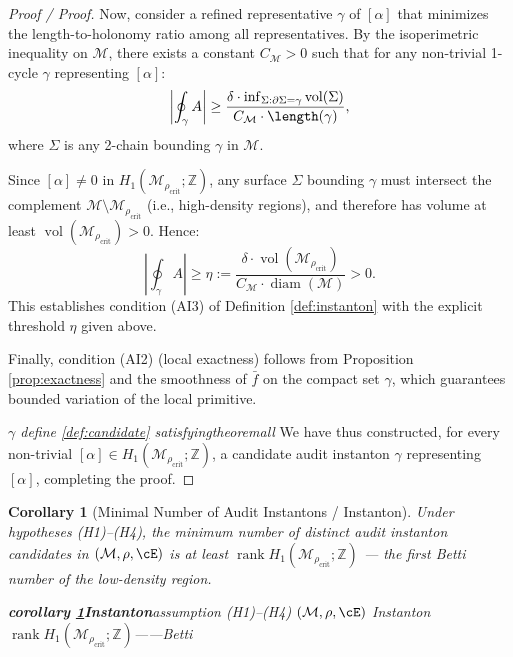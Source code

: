 \documentclass[11pt,a4paper]{article}
\theoremstyle{plain}
\newtheorem{corollary}[theorem]{Corollary}
\theoremstyle{definition}
\DeclareMathOperator{\rank}{rank}
\DeclareMathOperator{\vol}{vol}
\DeclareMathOperator{\diam}{diam}
\newcommand{\Z}{\mathbb{Z}}
\newcommand{\cM}{\mathcal{M}}
\begin{document}
\begin{proof}[Proof / Proof]
Now, consider a refined representative $\gamma$ of $[\alpha]$ that 
minimizes the length-to-holonomy ratio among all representatives. By 
the isoperimetric inequality on $\cM$, there exists a constant 
$C_{\cM} > 0$ such that for any non-trivial 1-cycle $\gamma$ representing 
$[\alpha]$:
\begin{equation}
  \left|\oint_{\gamma} A\right| \geq \frac{\delta \cdot \inf_{\Sigma: \partial\Sigma = \gamma} \vol(\Sigma)}{C_{\cM} \cdot \length(\gamma)},
  \label{eq:isoperimetric}
\end{equation}
where $\Sigma$ is any 2-chain bounding $\gamma$ in $\cM$.

Since $[\alpha] \neq 0$ in $H_1(\cM_{\rho_{\text{crit}}}; \Z)$, any surface 
$\Sigma$ bounding $\gamma$ must intersect the complement 
$\cM \setminus \cM_{\rho_{\text{crit}}}$ (i.e., high-density regions), and 
therefore has volume at least $\vol(\cM_{\rho_{\text{crit}}}) > 0$. Hence:
\begin{equation}
  \left|\oint_{\gamma} A\right| \geq \eta := 
    \frac{\delta \cdot \vol(\cM_{\rho_{\text{crit}}})}{C_{\cM} \cdot \diam(\cM)} > 0.
  \label{eq:eta_bound}
\end{equation}
This establishes condition (AI3) of Definition \ref{def:instanton} with 
the explicit threshold $\eta$ given above.

Finally, condition (AI2) (local exactness) follows from Proposition 
\ref{prop:exactness} and the smoothness of $\bar{f}$ on the compact set 
$\gamma$, which guarantees bounded variation of the local primitive.

\medskip
\noindent
\textit{$\gamma$ define \ref{def:candidate} satisfyingtheoremall}
We have thus constructed, for every non-trivial $[\alpha] \in H_1(\cM_{\rho_{\text{crit}}}; \Z)$, 
a candidate audit instanton $\gamma$ representing $[\alpha]$, completing the proof.
\end{proof}

\begin{corollary}[Minimal Number of Audit Instantons / Instanton]
\label{cor:min}
Under hypotheses (H1)--(H4), the minimum number of \emph{distinct} audit 
instanton candidates in $(\cM, \rho, \cE)$ is at least 
$\rank H_1(\cM_{\rho_{\text{crit}}}; \Z)$ — the first Betti number of the 
low-density region.
\end{corollary}

\bigskip
\noindent
\textit{\textbf{corollary \ref{cor:min}Instanton}assumption (H1)--(H4) $(\cM, \rho, \cE)$ \textbf{}Instanton $\rank H_1(\cM_{\rho_{\text{crit}}}; \Z)$——Betti}
\end{document}
